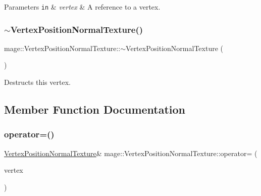 \begin{DoxyParams}[1]{Parameters}
\mbox{\tt in}  & {\em vertex} & A reference to a vertex. \\
\hline
\end{DoxyParams}
\hypertarget{structmage_1_1_vertex_position_normal_texture_a1dbfd9a6f88f075b59e56c353986b189}{}\label{structmage_1_1_vertex_position_normal_texture_a1dbfd9a6f88f075b59e56c353986b189} 
\subsubsection{\texorpdfstring{$\sim$\+Vertex\+Position\+Normal\+Texture()}{~VertexPositionNormalTexture()}}
{\footnotesize\ttfamily mage\+::\+Vertex\+Position\+Normal\+Texture\+::$\sim$\+Vertex\+Position\+Normal\+Texture (\begin{DoxyParamCaption}{ }\end{DoxyParamCaption})\hspace{0.3cm}{\ttfamily [default]}}

Destructs this vertex. 

\subsection{Member Function Documentation}
\hypertarget{structmage_1_1_vertex_position_normal_texture_a89b92b0932f3271cb90c3a800e6c60a3}{}\label{structmage_1_1_vertex_position_normal_texture_a89b92b0932f3271cb90c3a800e6c60a3} 
\subsubsection{\texorpdfstring{operator=()}{operator=()}\hspace{0.1cm}{\footnotesize\ttfamily [1/2]}}
{\footnotesize\ttfamily \hyperlink{structmage_1_1_vertex_position_normal_texture}{Vertex\+Position\+Normal\+Texture}\& mage\+::\+Vertex\+Position\+Normal\+Texture\+::operator= (\begin{DoxyParamCaption}\item[{const \hyperlink{structmage_1_1_vertex_position_normal_texture}{Vertex\+Position\+Normal\+Texture} \&}]{vertex }\end{DoxyParamCaption})\hspace{0.3cm}{\ttfamily [default]}}

